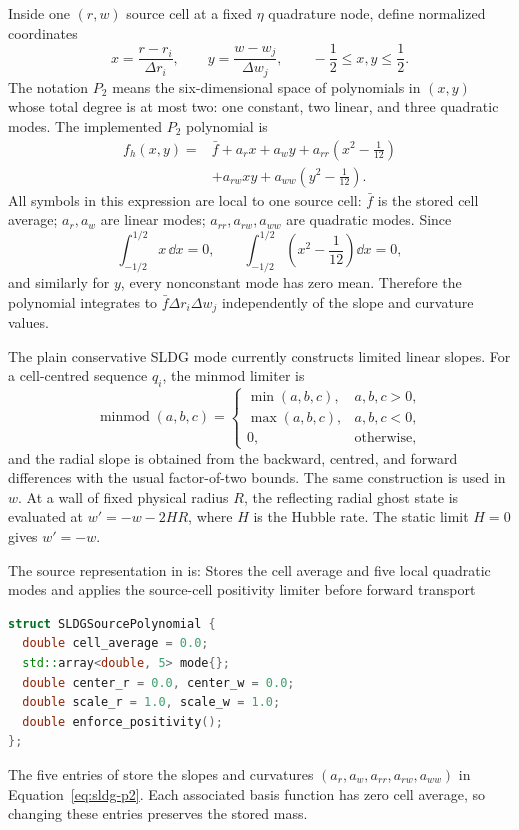 Inside one \((r,w)\) source cell at a fixed \(\eta\) quadrature node, define
normalized coordinates
\[
 x=\frac{r-r_i}{\Delta r_i},
 \qquad
 y=\frac{w-w_j}{\Delta w_j},
 \qquad -\frac12\le x,y\le\frac12 .
\]
The notation \(P_2\) means the six-dimensional space of polynomials in
\((x,y)\) whose total degree is at most two: one constant, two linear, and
three quadratic modes.  The implemented \(P_2\) polynomial is
\begin{equation*}
 \begin{split}
 f_h(x,y)={}&\bar f
 +a_r x+a_w y
 +a_{rr}\left(x^2-\frac1{12}\right)\\
 &+a_{rw}xy
 +a_{ww}\left(y^2-\frac1{12}\right).
 \end{split}
 \tag{SLDG-P2}\label{eq:sldg-p2}
\end{equation*}
All symbols in this expression are local to one source cell:
\(\bar f\) is the stored cell average; \(a_r,a_w\) are linear modes;
\(a_{rr},a_{rw},a_{ww}\) are quadratic modes.  Since
\[
 \int_{-1/2}^{1/2}x\,\dd x=0,
 \qquad
 \int_{-1/2}^{1/2}\left(x^2-\frac1{12}\right)\dd x=0,
\]
and similarly for \(y\), every nonconstant mode has zero mean.  Therefore the
polynomial integrates to \(\bar f\Delta r_i\Delta w_j\) independently of
the slope and curvature values.

The plain conservative SLDG mode currently constructs limited linear slopes.
For a cell-centred sequence \(q_i\), the minmod limiter is
\[
 \operatorname{minmod}(a,b,c)=
 \begin{cases}
  \min(a,b,c),&a,b,c>0,\\
  \max(a,b,c),&a,b,c<0,\\
  0,&\text{otherwise},
 \end{cases}
\]
and the radial slope is obtained from the backward, centred, and forward
differences with the usual factor-of-two bounds.  The same construction is
used in \(w\). At a wall of fixed physical radius \(R\), the reflecting
radial ghost state is evaluated at \(w'=-w-2HR\), where \(H\) is the
Hubble rate. The static limit \(H=0\) gives \(w'=-w\).

The source representation in
 is:
{}
{Stores the cell average and five local quadratic modes and applies the
 source-cell positivity limiter before forward transport}
\begin{lstlisting}[language=C++]
struct SLDGSourcePolynomial {
  double cell_average = 0.0;
  std::array<double, 5> mode{};
  double center_r = 0.0, center_w = 0.0;
  double scale_r = 1.0, scale_w = 1.0;
  double enforce_positivity();
};
\end{lstlisting}
The five entries of  store the slopes and curvatures
\((a_r,a_w,a_{rr},a_{rw},a_{ww})\) in
Equation~\eqref{eq:sldg-p2}.  Each associated basis function has zero cell
average, so changing these entries preserves the stored mass.


